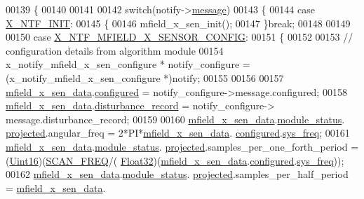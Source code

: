 \begin{DoxyCode}
00139 \{
00140 
00141 
00142     \textcolor{keywordflow}{switch}(notify->\hyperlink{a00036_adf9665938515a20c283eea2c978cf80d}{message})
00143     \{
00144         \textcolor{keywordflow}{case} \hyperlink{a00036_a620b808f2d7b8d2a03c4d026a4c5423c}{X\_NTF\_INIT}:
00145         \{
00146             mfield\_x\_sen\_init();
00147         \}\textcolor{keywordflow}{break};
00148 
00149 
00150         \textcolor{keywordflow}{case} \hyperlink{a00019_aa16cf9dd51c7cbef48581b7862153ced}{X\_NTF\_MFIELD\_X\_SENSOR\_CONFIG}:
00151         \{
00152 
00153             \textcolor{comment}{// configuration details from algorithm module}
00154             x\_notify\_mfield\_x\_sen\_configure * notify\_configure = (x\_notify\_mfield\_x\_sen\_configure *)notify;
00155 
00156 
00157             \hyperlink{a00052_af8c531b1ba5fea148fb9111e06058f92}{mfield\_x\_sen\_data}.\hyperlink{a00025_a94b2d1f6ea4ab334c74d24984dd27843}{configured} = notify\_configure->message.configured;
00158             \hyperlink{a00052_af8c531b1ba5fea148fb9111e06058f92}{mfield\_x\_sen\_data}.\hyperlink{a00025_ac9b38e2c1d3f1013a88d33506c754152}{disturbance\_record} = notify\_configure->
      message.disturbance\_record;
00159 
00160            \hyperlink{a00052_af8c531b1ba5fea148fb9111e06058f92}{mfield\_x\_sen\_data}.\hyperlink{a00025_adfab5a5d8b45a93dfb13edb24e2b80e3}{module\_status}.
      \hyperlink{a00019_af2267fb093fb5dcaa006a570a6da3b6b}{projected}.angular\_freq             = 2*PI*\hyperlink{a00052_af8c531b1ba5fea148fb9111e06058f92}{mfield\_x\_sen\_data}.
      \hyperlink{a00025_a94b2d1f6ea4ab334c74d24984dd27843}{configured}.\hyperlink{a00021_aa57be45aa1320405a885474010159c9e}{sys\_freq};
00161            \hyperlink{a00052_af8c531b1ba5fea148fb9111e06058f92}{mfield\_x\_sen\_data}.\hyperlink{a00025_adfab5a5d8b45a93dfb13edb24e2b80e3}{module\_status}.
      \hyperlink{a00019_af2267fb093fb5dcaa006a570a6da3b6b}{projected}.samples\_per\_one\_forth\_period       = (\hyperlink{a00072_a59a9f6be4562c327cbfb4f7e8e18f08b}{Uint16})(\hyperlink{a00021_a8127170b687c1f67a968886c128e76e4}{SCAN\_FREQ}/(
      \hyperlink{a00072_a87d38f886e617ced2698fc55afa07637}{Float32})(\hyperlink{a00052_af8c531b1ba5fea148fb9111e06058f92}{mfield\_x\_sen\_data}.\hyperlink{a00025_a94b2d1f6ea4ab334c74d24984dd27843}{configured}.\hyperlink{a00021_aa57be45aa1320405a885474010159c9e}{sys\_freq}));
00162            \hyperlink{a00052_af8c531b1ba5fea148fb9111e06058f92}{mfield\_x\_sen\_data}.\hyperlink{a00025_adfab5a5d8b45a93dfb13edb24e2b80e3}{module\_status}.
      \hyperlink{a00019_af2267fb093fb5dcaa006a570a6da3b6b}{projected}.samples\_per\_half\_period  = \hyperlink{a00052_af8c531b1ba5fea148fb9111e06058f92}{mfield\_x\_sen\_data}.

\end{DoxyCode}
